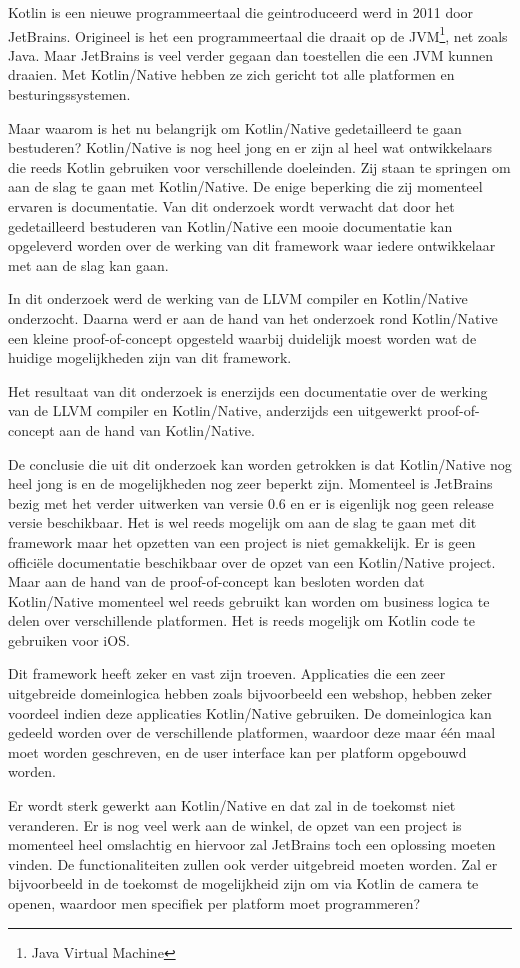 Kotlin is een nieuwe programmeertaal die geintroduceerd werd in 2011 door JetBrains. Origineel is het een programmeertaal die draait op de JVM\footnote{Java Virtual Machine}, net zoals Java. Maar JetBrains is veel verder gegaan dan toestellen die een JVM kunnen draaien. Met Kotlin/Native hebben ze zich gericht tot alle platformen en besturingssystemen. 


Maar waarom is het nu belangrijk om Kotlin/Native gedetailleerd te gaan bestuderen? Kotlin/Native is nog heel jong en er zijn al heel wat ontwikkelaars die reeds Kotlin gebruiken voor verschillende doeleinden. Zij staan te springen om aan de slag te gaan met Kotlin/Native. De enige beperking die zij momenteel ervaren is documentatie. Van dit onderzoek wordt verwacht dat door het gedetailleerd bestuderen van Kotlin/Native een mooie documentatie kan opgeleverd worden over de werking van dit framework waar iedere ontwikkelaar met aan de slag kan gaan.

In dit onderzoek werd de werking van de LLVM compiler en Kotlin/Native onderzocht. Daarna werd er aan de hand van het onderzoek rond Kotlin/Native een kleine proof-of-concept opgesteld waarbij duidelijk moest worden wat de huidige mogelijkheden zijn van dit framework.

Het resultaat van dit onderzoek is enerzijds een documentatie over de werking van de LLVM compiler en Kotlin/Native, anderzijds een uitgewerkt proof-of-concept aan de hand van Kotlin/Native.

De conclusie die uit dit onderzoek kan worden getrokken is dat Kotlin/Native nog heel jong is en de mogelijkheden nog zeer beperkt zijn. Momenteel is JetBrains bezig met het verder uitwerken van versie 0.6 en er is eigenlijk nog geen release versie beschikbaar. Het is wel reeds mogelijk om aan de slag te gaan met dit framework maar het opzetten van een project is niet gemakkelijk. Er is geen officiële documentatie beschikbaar over de opzet van een Kotlin/Native project. Maar aan de hand van de proof-of-concept kan besloten worden dat Kotlin/Native momenteel wel reeds gebruikt kan worden om business logica te delen over verschillende platformen. Het is reeds mogelijk om Kotlin code te gebruiken voor iOS.

Dit framework heeft zeker en vast zijn troeven. Applicaties die een zeer uitgebreide domeinlogica hebben zoals bijvoorbeeld een webshop, hebben zeker voordeel indien deze applicaties Kotlin/Native gebruiken. De domeinlogica kan gedeeld worden over de verschillende platformen, waardoor deze maar één maal moet worden geschreven, en de user interface kan per platform opgebouwd worden. 

Er wordt sterk gewerkt aan Kotlin/Native en dat zal in de toekomst niet veranderen. Er is nog veel werk aan de winkel, de opzet van een project is momenteel heel omslachtig en hiervoor zal JetBrains toch een oplossing moeten vinden. De functionaliteiten zullen ook verder uitgebreid moeten worden. Zal er bijvoorbeeld in de toekomst de mogelijkheid zijn om via Kotlin de camera te openen, waardoor men specifiek per platform moet programmeren?